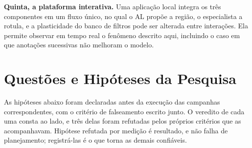 \textbf{Quinta, a plataforma interativa.} Uma aplicação local integra os três componentes em um fluxo único, no qual o \ac{AL} propõe a região, o especialista a rotula, e a plasticidade do banco de filtros pode ser alterada entre interações. Ela permite observar em tempo real o fenômeno descrito aqui, incluindo o caso em que anotações sucessivas não melhoram o modelo.

\section{Questões e Hipóteses da Pesquisa}

As hipóteses abaixo foram declaradas antes da execução das campanhas correspondentes, com o critério de falseamento escrito junto. O veredito de cada uma consta ao lado, e três delas foram refutadas pelos próprios critérios que as acompanhavam. Hipótese refutada por medição é resultado, e não falha de planejamento; registrá-las é o que torna as demais confiáveis.

